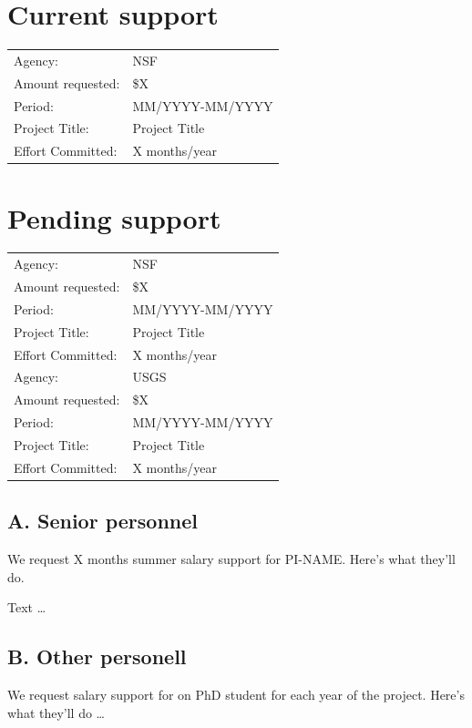 \documentclass{DOEproposal}
\begin{document}
\section*{Current support}
\begin{tabular}{p{}p{}}\hline
Agency: 			& NSF						\\
Amount requested: 	& \$X					\\
Period: 			& MM/YYYY-MM/YYYY			\\
Project Title:		& Project Title \\
Effort Committed: 	& X months/year				\\\hline
\end{tabular}

\section*{Pending support}
\begin{tabular}{p{}p{}}\hline
Agency: 			& NSF						\\
Amount requested: 	& \$X					\\
Period: 			& MM/YYYY-MM/YYYY			\\
Project Title:		& Project Title \\
Effort Committed: 	& X months/year				\\\hline
Agency: 			& USGS						\\
Amount requested: 	& \$X					\\
Period: 			& MM/YYYY-MM/YYYY			\\
Project Title:		& Project Title \\
Effort Committed: 	& X months/year				\\\hline
\end{tabular}



\newpage
{}
\renewcommand{\thepage} {G--\arabic{page}}

\subsection*{A. Senior personnel}
 We request X months summer salary support for PI-NAME. Here's what they'll do.

 Text \dots

\subsection*{B. Other personell}
 We request salary support for on PhD student for each year of the project. Here's what they'll do \dots
\end{document}
